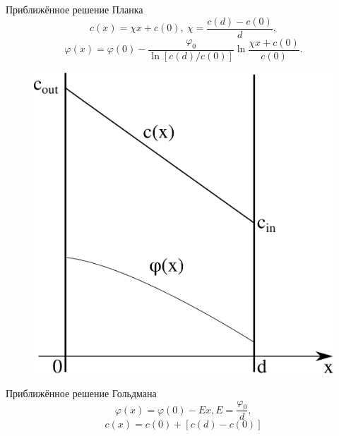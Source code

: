 \documentclass[10pt,pdf]{beamer}
\renewcommand{\phi}{\varphi}
\begin{document}
  \begin{frame}
      \begin{minipage}{.47\textwidth}
      Приближённое решение Планка
    \begingroup
    \everymath{\scriptstyle}
    \scriptsize
      \begin{equation}
          c(x) = \chi x + c(0),\ \chi = \frac{c(d)-c(0)}{d},
      \end{equation}
      \begin{equation}
          \phi(x) = \phi(0)
          -\frac{\phi_0}{\ln[c(d) / c(0)]}\ln\frac{\chi x + c(0)}{c(0)}.
      \end{equation}
      \endgroup
      \begin{figure}[H]
          \center
          \includegraphics[height=.5\textheight]{planck}
      \end{figure}
      \end{minipage}\hfill
      \begin{minipage}{.47\textwidth}
      Приближённое решение Гольдмана
    \begingroup
    \everymath{\scriptstyle}
    \scriptsize
      \begin{equation}
          \phi(x) = \phi(0) - Ex, E = \frac{\phi_0}{d},
      \end{equation}
      \begin{equation}
          c(x) = c(0) + [c(d) - c(0)]

\end{equation}
\end{minipage}
\end{frame}
\end{document}
